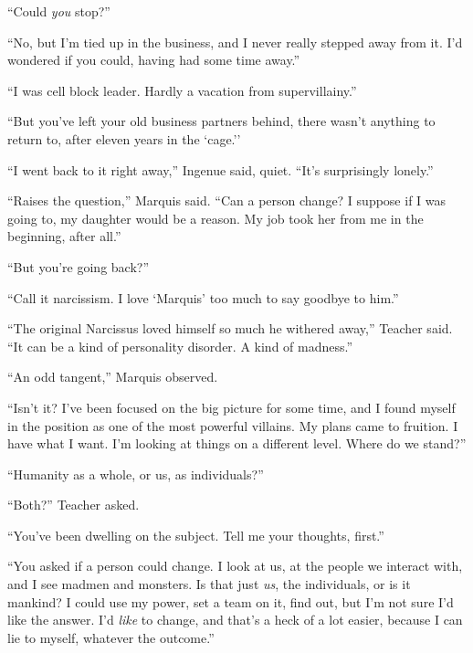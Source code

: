 ``Could \emph{you} stop?''



``No, but I'm tied up in the business, and  I never really stepped away from it.  I'd wondered if you could, having had some time away.''



``I was cell block leader.  Hardly a vacation from supervillainy.''



``But you've left your old business partners behind, there wasn't anything to return to, after eleven years in the `cage.''



``I went back to it right away,'' Ingenue said, quiet.  ``It's surprisingly lonely.''



``Raises the question,'' Marquis said.  ``Can a person change?  I suppose if I was going to, my daughter would be a reason.  My job took her from me in the beginning, after all.''



``But you're going back?''



``Call it narcissism.  I love `Marquis' too much to say goodbye to him.''



``The original Narcissus loved himself so much he withered away,'' Teacher said.  ``It can be a kind of personality disorder.  A kind of madness.''



``An odd tangent,'' Marquis observed.



``Isn't it?  I've been focused on the big picture for some time, and I found myself in the position as one of the most powerful villains.  My plans came to fruition.  I have what I want.  I'm looking at things on a different level.  Where do we stand?''



``Humanity as a whole, or us, as individuals?''



``Both?''  Teacher asked.



``You've been dwelling on the subject.  Tell me your thoughts, first.''



``You asked if a person could change.  I look at us, at the people we interact with, and I see madmen and monsters.  Is that just \emph{us}, the individuals, or is it mankind?  I could use my power, set a team on it, find out, but I'm not sure I'd like the answer.  I'd \emph{like} to change, and that's a heck of a lot easier, because I can lie to myself, whatever the outcome.''



